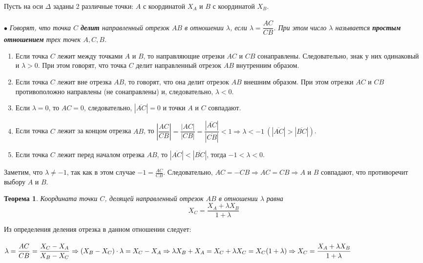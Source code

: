Пусть на оси $\Delta$ заданы 2 различные точки: $A$ с координатой $X_A$ и $B$ с координатой $X_B$.\\\\
$\bullet$ \textit{Говорят, что точка $C$ \textbf{делит} направленный отрезок $AB$ в отношении $\lambda$, если $\lambda = \dfrac{AC}{CB}$. При этом число $\lambda$ называется \textbf{простым отношением} трех точек $A, C, B$.}
\begin{enumerate}
	\item Если точка $C$ лежит между точками $A$ и $B$, то направляющие отрезки $AC$ и $CB$ сонаправлены. Следовательно, знак у них одинаковый и $\lambda>0$. При этом говорят, что точка $C$ делит направленный отрезок $AB$ внутренним образом.
	\item Если точка $C$ лежит вне отрезка $AB$, то говорят, что она делит отрезок $AB$ внешним образом. При этом отрезки $AC$ и $CB$ противоположно направлены (не сонаправлены) и, следовательно, $\lambda <0$.
	\item Если $\lambda = 0$, то $AC = 0$, следовательно, $|\overline{AC}| = 0$ и точки $A$ и $C$ совпадают.
	\item Если точка $C$ лежит за концом отрезка $AB$, то $\left |\dfrac{AC}{CB}\right | = \dfrac{|AC|}{|CB|} = \dfrac{|\overline{AC}|}{|\overline{CB}|} <1\Rightarrow \lambda < -1\ (|\overline{AC}| >  |\overline{BC}|)$.
	\item Если точка $C$ лежит перед началом отрезка $AB$, то $|\overline{AC}| < |\overline{BC}|$, тогда $-1 < \lambda < 0$.
\end{enumerate}
Заметим, что $\lambda \ne -1$, так как в этом случае $-1 = \frac{AC}{CB}$. Следовательно, $AC = -CB\Rightarrow AC = CB\Rightarrow A$ и $B$ совпадают, что противоречит выбору $A$ и $B$.
\newtheorem*{t1_3}{Теорема}\begin{t1_3}
	Координата точки $C$, делящей направленный отрезок $AB$ в отношении $\lambda$ равна $$X_C = \dfrac{X_A + \lambda X_B}{1+\lambda}$$
\end{t1_3}\begin{Proof}
	Из определения деления отрезка в данном отношении следует:\\\\ $\lambda = \dfrac{AC}{CB} = \dfrac{X_C - X_A}{X_B-X_C}\Rightarrow (X_B - X_C)\cdot \lambda = X_C - X_A\Rightarrow \lambda X_B + X_A = X_C + \lambda X_C = X_C(1 + \lambda)\Rightarrow \\\\X_C = \dfrac{X_A+\lambda X_B}{1+ \lambda}$
\end{Proof}











